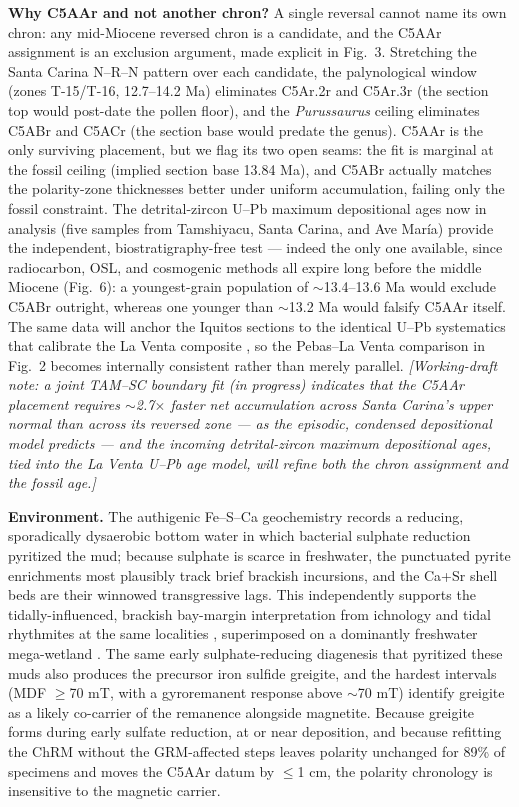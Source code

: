 \documentclass[12pt]{article}
\begin{document}
\textbf{Why C5AAr and not another chron?} A single reversal cannot name its own chron: any
mid-Miocene reversed chron is a candidate, and the C5AAr assignment is an exclusion
argument, made explicit in Fig.~3. Stretching the Santa Carina N--R--N pattern over each
candidate, the palynological window (zones T-15/T-16, 12.7--14.2 Ma) eliminates C5Ar.2r and
C5Ar.3r (the section top would post-date the pollen floor), and the \textit{Purussaurus}
ceiling eliminates C5ABr and C5ACr (the section base would predate the genus). C5AAr is the
only surviving placement, but we flag its two open seams: the fit is marginal at the fossil
ceiling (implied section base 13.84 Ma), and C5ABr actually matches the polarity-zone
thicknesses better under uniform accumulation, failing only the fossil constraint. The
detrital-zircon U--Pb maximum depositional ages now in analysis (five samples from
Tamshiyacu, Santa Carina, and Ave Mar\'ia) provide the independent, biostratigraphy-free
test --- indeed the only one available, since radiocarbon, OSL, and cosmogenic methods all
expire long before the middle Miocene (Fig.~6): a youngest-grain population of $\sim$13.4--13.6 Ma would exclude C5ABr outright,
whereas one younger than $\sim$13.2 Ma would falsify C5AAr itself. The same data will
anchor the Iquitos sections to the identical U--Pb systematics that calibrate the La Venta
composite \citep{MoraRojas2023}, so the Pebas--La Venta comparison in Fig.~2 becomes
internally consistent rather than merely parallel. \textit{[Working-draft note: a joint TAM--SC boundary fit (in progress) indicates that the
C5AAr placement requires $\sim$2.7$\times$ faster net accumulation across Santa Carina's
upper normal than across its reversed zone --- as the episodic, condensed depositional model
predicts --- and the incoming detrital-zircon maximum depositional ages, tied into the La
Venta U--Pb age model, will refine both the chron assignment and the fossil age.]}

\textbf{Environment.} The authigenic Fe--S--Ca geochemistry records a reducing, sporadically
dysaerobic bottom water in which bacterial sulphate reduction pyritized the mud; because
sulphate is scarce in freshwater, the punctuated pyrite enrichments most plausibly track
brief brackish incursions, and the Ca+Sr shell beds are their winnowed transgressive lags.
This independently supports the tidally-influenced, brackish bay-margin interpretation from
ichnology and tidal rhythmites at the same localities \citep{Gingras2002,Rasanen1995},
superimposed on a dominantly freshwater mega-wetland \citep{Hoorn2010,Wesselingh2006}.
The same early sulphate-reducing diagenesis that pyritized these muds also produces the
precursor iron sulfide greigite, and the hardest intervals (MDF $\ge$70 mT, with a
gyroremanent response above $\sim$70 mT) identify greigite as a likely co-carrier of the
remanence alongside magnetite. Because greigite forms during early sulfate reduction, at or
near deposition, and because refitting the ChRM without the GRM-affected steps leaves
polarity unchanged for 89\% of specimens and moves the C5AAr datum by $\le$1 cm, the
polarity chronology is insensitive to the magnetic carrier.
\end{document}
